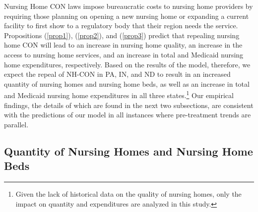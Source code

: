 \documentclass[../Main.tex]{subfiles}
\begin{document}
Nursing Home CON laws impose bureaucratic costs to nursing home providers by requiring those planning on opening a new nursing home or expanding a current facility to first show to a regulatory body that their region needs the service.  Propositions (\ref{prop1}), (\ref{prop2}), and (\ref{prop3}) predict that repealing nursing home CON will lead to an increase in nursing home quality, an increase in the access to nursing home services, and an increase in total and Medicaid nursing home expenditures, respectively. Based on the results of the model, therefore, we expect the repeal of NH-CON in PA, IN, and ND to result in an increased quantity of nursing homes and nursing home beds, as well as an increase in total and Medicaid nursing home expenditures in all three states.\footnote{Given the lack of historical data on the quality of nursing homes, only the impact on quantity and expenditures are analyzed in this study.}  Our empirical findings, the details of which are found in the next two subsections, are consistent with the predictions of our model in all instances where pre-treatment trends are parallel.

\subsection{Quantity of Nursing Homes and Nursing Home Beds}
\end{document}
